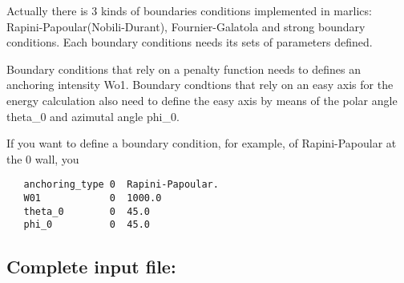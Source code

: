 \documentclass{article}
\begin{document}
Actually there is 3 kinds of boundaries conditions implemented in marlics: Rapini-Papoular(Nobili-Durant), Fournier-Galatola and strong boundary conditions. Each boundary conditions needs its sets  of parameters defined.

Boundary conditions that rely on a penalty function needs to defines an anchoring intensity Wo1. Boundary condtions that rely on an easy axis for the energy calculation also need to define the easy axis by means of the polar angle theta_0 and azimutal angle phi_0.

If you want to define a boundary condition, for example, of Rapini-Papoular at the 0 wall, you 
\begin{lstlisting}
   anchoring_type 0  Rapini-Papoular.
   W01            0  1000.0
   theta_0        0  45.0
   phi_0          0  45.0	
\end{lstlisting}




\subsection{Complete input file:}
\end{document}
